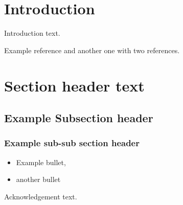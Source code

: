 \documentclass[sigconf]{acmart}
\begin{document}
%
    
\maketitle

\section{Introduction} 
Introduction text.

Example reference and another one with two references. 

\section{Section header text} 
\cite{ch00}
\cite{ch01}
\cite{ch02}
\cite{ch03}
\cite{ch04}
\cite{ch05}
\cite{ch06}
\cite{ch07}
\cite{ch08}
\cite{ch09}
\cite{ch10}
\cite{ch11}
\cite{ch12}
\cite{ch13}
\cite{ch14}
\cite{ch15}
\cite{ch16}
\cite{ch17}
\cite{ch18}
\cite{ch19}
\cite{ch20}
\cite{ch21}
\cite{ch22}
\cite{ch23, ch24, ch25}

\subsection{Example Subsection header} 

\cite{ch26}
\cite{ch27}
\cite{ch28}
\cite{ch29}
\cite{ch30}
\cite{ch31}



\subsubsection{Example sub-sub section header} 

\begin{itemize}
    \item Example bullet,
    \item another bullet
\end{itemize}



\begin{acks}
Acknowledgement text.
\end{acks}

%


\end{document}
